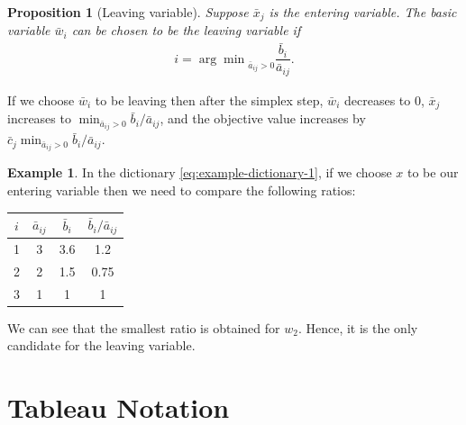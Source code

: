 \documentclass[
]{book}
\newtheorem{proposition}{Proposition}[chapter]
\theoremstyle{definition}
\theoremstyle{definition}
\newtheorem{example}{Example}[chapter]
\theoremstyle{definition}
\theoremstyle{definition}
\theoremstyle{remark}
\begin{document}
\begin{proposition}[Leaving variable]
\protect\hypertarget{prp:leaving-variable}{}\label{prp:leaving-variable}Suppose \(\bar{x}_j\) is the entering variable.
The basic variable \(\bar{w}_i\) can be chosen to be the leaving variable if
\begin{align*}
  i = {\arg \min} _{\bar{a}_{ij} > 0} \dfrac{\bar{b}_i}{\bar{a}_{ij}}.
\end{align*}
\end{proposition}

If we choose \(\bar{w}_i\) to be leaving then after the simplex step, \(\bar{w}_i\) decreases to \(0\), \(\bar{x}_j\) increases to \(\min_{\bar{a}_{ij} > 0} {\bar{b}_i}/{\bar{a}_{ij}}\), and the objective value increases by \(\bar{c}_j \min_{\bar{a}_{ij} > 0} {\bar{b}_i}/{\bar{a}_{ij}}\).

\begin{example}

In the dictionary \eqref{eq:example-dictionary-1}, if we choose \(x\) to be our entering variable then we need to compare the following ratios:

\begin{longtable}[]{@{}cccc@{}}
\toprule()
\(i\) & \(\bar{a}_{ij}\) & \(\bar{b}_i\) & \(\bar{b}_i/\bar{a}_{ij}\) \\
\midrule()
\endhead
1 & 3 & 3.6 & 1.2 \\
2 & 2 & 1.5 & 0.75 \\
3 & 1 & 1 & 1 \\
\bottomrule()
\end{longtable}

\end{example}

We can see that the smallest ratio is obtained for \(w_2\). Hence, it is the only candidate for the leaving variable.

\hypertarget{tableau-notation}{%
\section{Tableau Notation}\label{tableau-notation}}
\end{document}
